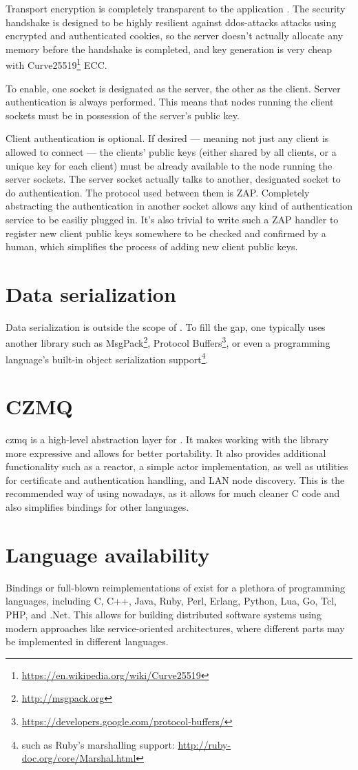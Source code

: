 Transport encryption is completely transparent to the application . The
security handshake is designed to be highly resilient against
\glspl{ddos-attack} attacks using encrypted and authenticated cookies, so the
server doesn't actually allocate any memory before the handshake is completed,
and key generation is very cheap \cite[p.~2]{djb:ed25519} with
Curve25519\footnote{\url{https://en.wikipedia.org/wiki/Curve25519}} \gls{ECC}.

To enable, one socket is designated as the server, the other as the client.
Server authentication is always performed. This means that nodes running the
client sockets must be in possession of the server's public key.

Client authentication is optional. If desired --- meaning not just any client
is allowed to connect --- the clients' public keys (either shared by all
clients, or a unique key for each client) must be already available to the node
running the server sockets. The server socket actually talks to another,
designated socket to do authentication. The protocol used between them is
\gls{ZAP}. Completely abstracting the authentication in another socket allows
any kind of authentication service to be easiliy plugged in. It's also trivial
to write such a ZAP handler to register new client public keys somewhere to be
checked and confirmed by a human, which simplifies the process of adding new
client public keys.

\section{Data serialization}
Data serialization is outside the scope of \zmq. To fill the gap, one typically
uses another library such as MsgPack\footnote{\url{http://msgpack.org}},
Protocol
Buffers\footnote{\url{https://developers.google.com/protocol-buffers/}}, or
even a programming language's built-in object serialization
support\footnote{such as Ruby's marshalling support:
\url{http://ruby-doc.org/core/Marshal.html}}.

\section{CZMQ}
\gls{czmq} is a high-level abstraction layer for \zmq. It makes working with the \zmq
library more expressive and allows for better portability. It also provides
additional functionality such as a reactor, a simple actor implementation, as
well as utilities for certificate and authentication handling, and LAN node
discovery. This is the recommended way of using \zmq nowadays, as it allows for
much cleaner C code and also simplifies bindings for other languages.

\section{Language availability}
Bindings or full-blown reimplementations of \zmq exist for a plethora of
programming languages, including C, C++, Java, Ruby, Perl, Erlang, Python, Lua,
Go, Tcl, PHP, and .Net. This allows for building distributed software systems
using modern approaches like service-oriented architectures, where different
parts may be implemented in different languages.
